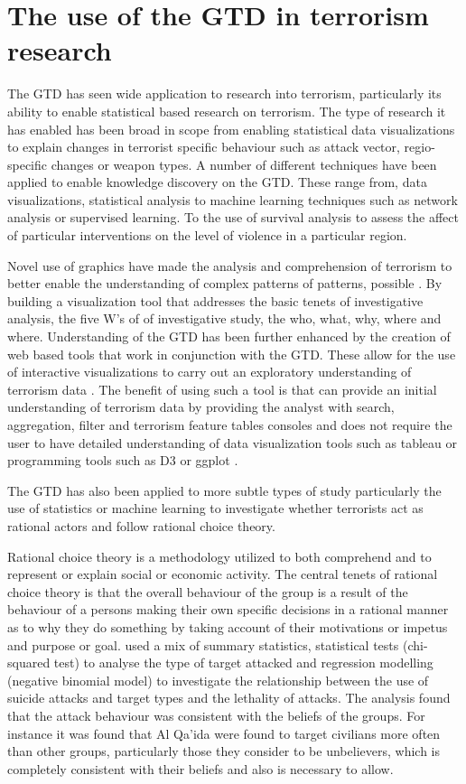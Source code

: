 \section{The use of the GTD in terrorism research}
The GTD has seen wide application to research into terrorism, particularly its ability to enable statistical based research on terrorism. The type of research it has enabled has been broad in scope from enabling statistical data visualizations to explain changes in terrorist specific behaviour such as attack vector, regio-specific changes or weapon types. A number of different techniques have been applied to enable knowledge discovery on the GTD. These range from, data visualizations, statistical analysis to machine learning techniques such as network analysis or supervised learning. To the use of survival analysis to assess the affect of particular interventions on the level of violence in a particular region.

Novel use of graphics have made the analysis and comprehension of terrorism to better enable the understanding of complex patterns of patterns, possible \citep{wang2008investigative}. By building a visualization tool that addresses the basic tenets of investigative analysis, the five W's of of investigative study, the who, what, why, where and where. Understanding of the GTD has been further enhanced by the creation of web based tools that work in conjunction with the GTD. These allow for the use of interactive visualizations  to carry out an exploratory understanding of terrorism data \citep{lee2008exploring}. The benefit of using such a tool is that can provide an initial understanding of terrorism data by providing the analyst with search, aggregation, filter  and terrorism feature tables consoles and does not require the user to have detailed understanding of data visualization tools such as tableau \citep{chabot2003tableau} or programming tools such as D3 \citep{bostock2012d3} or ggplot \citep{wickham2016programming}.

The GTD has also been applied to more subtle types of study particularly the use of statistics or machine learning to investigate whether terrorists act as rational actors and follow rational choice theory. 

Rational choice theory is a methodology utilized to both comprehend and to represent or explain social or economic activity. The central tenets of rational choice theory is  that the overall behaviour of the group is a result of the behaviour of   a persons making their own specific decisions in a rational manner as to why they do something by taking account of their motivations or impetus and purpose or goal. \citep{hepworth2013analysis} used a mix of summary statistics, statistical tests (chi-squared test) to analyse the type of target attacked and regression modelling (negative binomial model) to investigate the relationship between the use of suicide attacks and target types and the lethality of attacks. The analysis found that the attack behaviour was consistent with the beliefs of the groups. For instance it was found that Al Qa'ida were found to target civilians more often than other groups, particularly those they consider to be unbelievers, which is completely consistent with their beliefs and also is necessary to allow.


